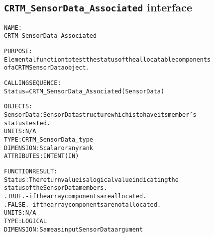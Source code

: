 \subsection{\texttt{CRTM\_SensorData\_Associated} interface}
  \label{sec:CRTM_SensorData_Associated_interface}
  \begin{alltt}
 
  NAME:
        CRTM_SensorData_Associated
 
  PURPOSE:
        Elemental function to test the status of the allocatable components
        of a CRTM SensorData object.
 
  CALLING SEQUENCE:
        Status = CRTM_SensorData_Associated( SensorData )
 
  OBJECTS:
        SensorData:  SensorData structure which is to have its member's
                     status tested.
                     UNITS:      N/A
                     TYPE:       CRTM_SensorData_type
                     DIMENSION:  Scalar or any rank
                     ATTRIBUTES: INTENT(IN)
 
  FUNCTION RESULT:
        Status:      The return value is a logical value indicating the
                     status of the SensorData members.
                       .TRUE.  - if the array components are allocated.
                       .FALSE. - if the array components are not allocated.
                     UNITS:      N/A
                     TYPE:       LOGICAL
                     DIMENSION:  Same as input SensorData argument
 
  \end{alltt}
